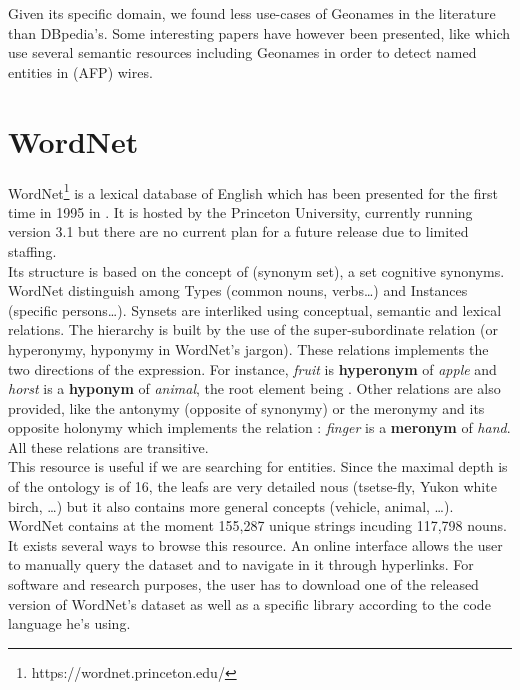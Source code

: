 Given its specific domain, we found less use-cases of Geonames in the literature than DBpedia's. Some interesting papers have however been presented, like \cite{stern2010detection} which use several semantic resources including Geonames in order to detect named entities in  (AFP) wires.

\section{WordNet} %
\label{sec:wordnet}

WordNet\footnote{https://wordnet.princeton.edu/} is a lexical database of English which has been presented for the first time in 1995 in \cite{miller1995wordnet}. It is hosted by the Princeton University, currently running version 3.1 but there are no current plan for a future release due to limited staffing.\\

Its structure is based on the concept of  (synonym set), a set cognitive synonyms. WordNet distinguish among Types (common nouns, verbs\dots) and Instances (specific persons\dots). Synsets are interliked using conceptual, semantic and lexical relations. The hierarchy is built by the use of the super-subordinate relation (or hyperonymy, hyponymy in WordNet's jargon). These relations implements the two directions of the  expression. For instance, \textit{fruit} is \textbf{hyperonym} of \textit{apple} and \textit{horst} is a \textbf{hyponym} of \textit{animal}, the root element being . Other relations are also provided, like the antonymy (opposite of synonymy) or the meronymy and its opposite holonymy which implements the  relation : \textit{finger} is a \textbf{meronym} of \textit{hand}. All these relations are transitive.\\

This resource is useful if we are searching for entities. Since the maximal depth is of the ontology is of 16, the leafs are very detailed nous (tsetse-fly, Yukon white birch, \dots) but it also contains more general concepts (vehicle, animal, \dots). WordNet contains at the moment 155,287 unique strings incuding 117,798 nouns.\\ 

It exists several ways to browse this resource. An online interface allows the user to manually query the dataset and to navigate in it through hyperlinks. For software and research purposes, the user has to download one of the released version of WordNet's dataset as well as a specific library according to the code language he's using.\\

